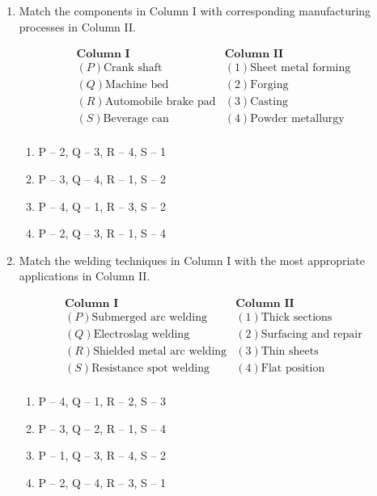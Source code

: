 \documentclass[12pt]{article}
\begin{document}
\begin{enumerate}
\item Match the components in Column I with corresponding manufacturing processes in Column II.

\[
\begin{array}{ll}
\textbf{Column I} & \textbf{Column II} \\
(P) \text{Crank shaft} & (1) \text{Sheet metal forming} \\
(Q) \text{Machine bed} & (2) \text{Forging} \\
(R) \text{Automobile brake pad} & (3) \text{Casting} \\
(S) \text{Beverage can} & (4) \text{Powder metallurgy} \\
\end{array}
\]

\begin{enumerate}[label=(\alph*)]
\item P – 2, Q – 3, R – 4, S – 1
\item P – 3, Q – 4, R – 1, S – 2
\item P – 4, Q – 1, R – 3, S – 2
\item P – 2, Q – 3, R – 1, S – 4
\end{enumerate}

\item Match the welding techniques in Column I with the most appropriate applications in Column II.

\[
\begin{array}{ll}
\textbf{Column I} & \textbf{Column II} \\
(P) \text{Submerged arc welding} & (1) \text{Thick sections} \\
(Q) \text{Electroslag welding} & (2) \text{Surfacing and repair} \\
(R) \text{Shielded metal arc welding} & (3) \text{Thin sheets} \\
(S) \text{Resistance spot welding} & (4) \text{Flat position} \\
\end{array}
\]

\begin{enumerate}[label=(\alph*)]
\item P – 4, Q – 1, R – 2, S – 3
\item P – 3, Q – 2, R – 1, S – 4
\item P – 1, Q – 3, R – 4, S – 2
\item P – 2, Q – 4, R – 3, S – 1
\end{enumerate}


\end{enumerate}
\end{document}
